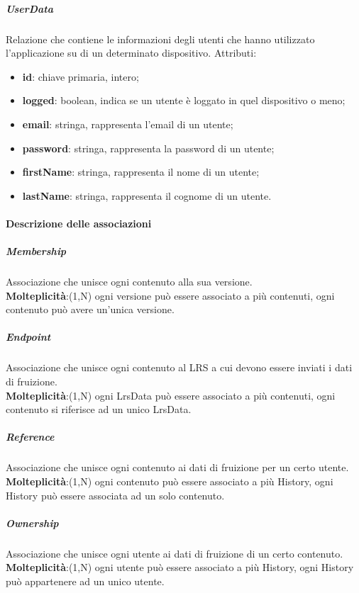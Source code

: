 \documentclass[../Tesi.tex]{subfiles}
\begin{document}
				\subparagraph*{UserData}
				Relazione che contiene le informazioni degli utenti che hanno utilizzato l'applicazione su di un determinato dispositivo. Attributi:
				\begin{itemize}
					\item \textbf{id}: chiave primaria, intero;
					\item \textbf{logged}: boolean, indica se un utente è loggato in quel dispositivo o meno;
					\item \textbf{email}: stringa, rappresenta l'email di un utente;
					\item \textbf{password}: stringa, rappresenta la password di un utente;
					\item \textbf{firstName}: stringa, rappresenta il nome di un utente;
					\item \textbf{lastName}: stringa, rappresenta il cognome di un utente.
				\end{itemize}

			\paragraph{Descrizione delle associazioni}
				\subparagraph*{Membership}
				Associazione che unisce ogni contenuto alla sua versione.\\
				\textbf{Molteplicità}:(1,N) ogni versione può essere associato a più contenuti, ogni contenuto può avere un'unica versione.

				\subparagraph*{Endpoint}
				Associazione che unisce ogni contenuto al LRS a cui devono essere inviati i dati di fruizione.\\
				\textbf{Molteplicità}:(1,N) ogni LrsData può essere associato a più contenuti, ogni contenuto si riferisce ad un unico LrsData.

				\subparagraph*{Reference}
				Associazione che unisce ogni contenuto ai dati di fruizione per un certo utente.\\
				\textbf{Molteplicità}:(1,N) ogni contenuto può essere associato a più History, ogni History può essere associata ad un solo contenuto.

				\subparagraph*{Ownership}
				Associazione che unisce ogni utente ai dati di fruizione di un certo contenuto.\\
				\textbf{Molteplicità}:(1,N) ogni utente può essere associato a più History, ogni History può appartenere ad un unico utente.
\end{document}
